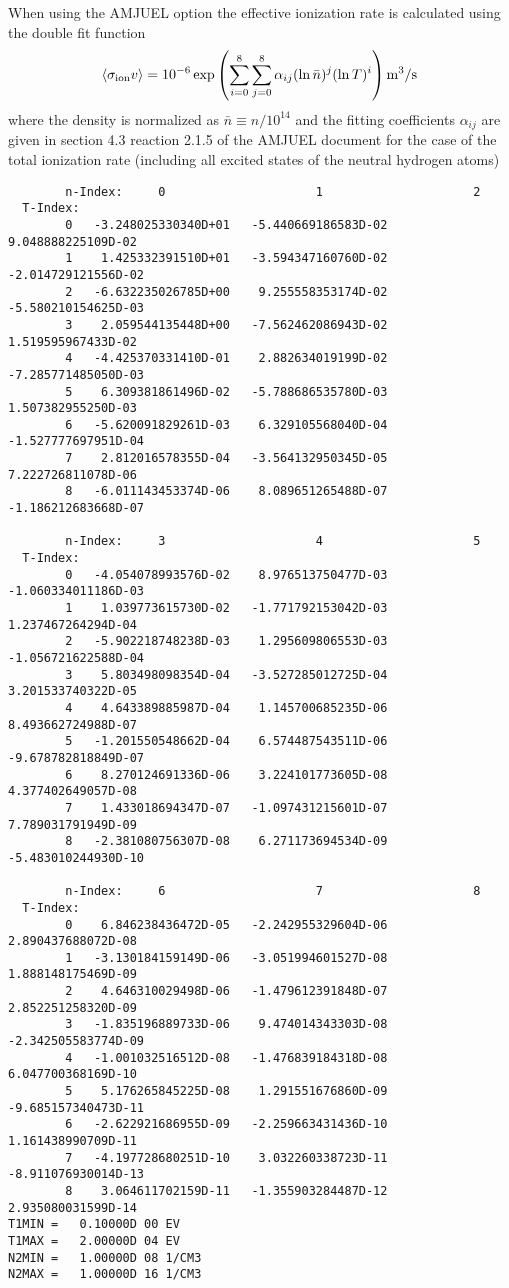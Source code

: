 \documentclass[amsmath,amssymb,a4]{revtex4}
\begin{document}
When using the AMJUEL option the effective ionization rate is calculated using the double fit function
\begin{equation}\label{ionization_AMJUEL}
    \langle\sigma_{\rm ion} v\rangle = 10^{-6} \exp\left( \sum_{i=0}^8\sum_{j=0}^8 \alpha_{ij} (\ln \bar n)^j (\ln T)^i \right)  {\rm m}^3/{\rm s}
\end{equation}
where the density is normalized as $\bar n \equiv n / 10^{14}$ and the fitting coefficients $\alpha_{ij}$ are given in section 4.3 reaction 2.1.5 of the AMJUEL document for the case of the total ionization rate (including all excited states of the neutral hydrogen atoms)
\begin{small}\begin{verbatim}
        n-Index:     0                     1                     2
  T-Index:
        0   -3.248025330340D+01   -5.440669186583D-02    9.048888225109D-02
        1    1.425332391510D+01   -3.594347160760D-02   -2.014729121556D-02
        2   -6.632235026785D+00    9.255558353174D-02   -5.580210154625D-03
        3    2.059544135448D+00   -7.562462086943D-02    1.519595967433D-02
        4   -4.425370331410D-01    2.882634019199D-02   -7.285771485050D-03
        5    6.309381861496D-02   -5.788686535780D-03    1.507382955250D-03
        6   -5.620091829261D-03    6.329105568040D-04   -1.527777697951D-04
        7    2.812016578355D-04   -3.564132950345D-05    7.222726811078D-06
        8   -6.011143453374D-06    8.089651265488D-07   -1.186212683668D-07

        n-Index:     3                     4                     5
  T-Index:
        0   -4.054078993576D-02    8.976513750477D-03   -1.060334011186D-03
        1    1.039773615730D-02   -1.771792153042D-03    1.237467264294D-04
        2   -5.902218748238D-03    1.295609806553D-03   -1.056721622588D-04
        3    5.803498098354D-04   -3.527285012725D-04    3.201533740322D-05
        4    4.643389885987D-04    1.145700685235D-06    8.493662724988D-07
        5   -1.201550548662D-04    6.574487543511D-06   -9.678782818849D-07
        6    8.270124691336D-06    3.224101773605D-08    4.377402649057D-08
        7    1.433018694347D-07   -1.097431215601D-07    7.789031791949D-09
        8   -2.381080756307D-08    6.271173694534D-09   -5.483010244930D-10

        n-Index:     6                     7                     8
  T-Index:
        0    6.846238436472D-05   -2.242955329604D-06    2.890437688072D-08
        1   -3.130184159149D-06   -3.051994601527D-08    1.888148175469D-09
        2    4.646310029498D-06   -1.479612391848D-07    2.852251258320D-09
        3   -1.835196889733D-06    9.474014343303D-08   -2.342505583774D-09
        4   -1.001032516512D-08   -1.476839184318D-08    6.047700368169D-10
        5    5.176265845225D-08    1.291551676860D-09   -9.685157340473D-11
        6   -2.622921686955D-09   -2.259663431436D-10    1.161438990709D-11
        7   -4.197728680251D-10    3.032260338723D-11   -8.911076930014D-13
        8    3.064611702159D-11   -1.355903284487D-12    2.935080031599D-14
T1MIN =   0.10000D 00 EV
T1MAX =   2.00000D 04 EV
N2MIN =   1.00000D 08 1/CM3
N2MAX =   1.00000D 16 1/CM3
\end{verbatim}\end{small}
\end{document}
